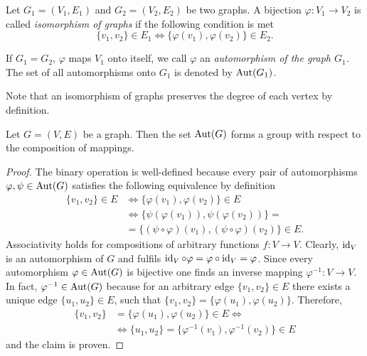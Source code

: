 \begin{defin}
\begin{thmlist}
\item Let $G_1=(V_1,E_1)$ and $G_2=(V_2,E_2)$ be two graphs. A bijection $\varphi\colon V_1 \to V_2$ is called \emph{isomorphism of graphs} if the following condition is met
\begin{equation*}
\lbrace v_1,v_2\rbrace\in E_1 \Leftrightarrow \lbrace \varphi(v_1),\varphi(v_2)\rbrace\in E_2.
\end{equation*}
\item If $G_1=G_2$, \ie $\varphi$ maps $V_1$ onto itself, we call $\varphi$ an \emph{automorphism of the graph $G_1$.} The set of all automorphisms onto $G_1$ is denoted by $\operatorname{Aut}(G_1)$.
\end{thmlist}
\end{defin}
\begin{rem}
Note that an isomorphism of graphs preserves the degree of each vertex by definition.
\end{rem}
\begin{thm}\label{thm:Graph-Automorphisms Form a Group}
Let $G=(V,E)$ be a graph. Then the set $\operatorname{Aut}(G)$ forms a group with respect to the composition of mappings.
\end{thm}
\begin{proof}
The binary operation is well-defined because every pair of automorphisms $\varphi,\psi\in\operatorname{Aut}(G)$ satisfies the following equivalence by definition
\begin{align*}
\lbrace v_1,v_2\rbrace\in E&\Leftrightarrow\lbrace \varphi(v_1),\varphi(v_2)\rbrace\in E\\
&\Leftrightarrow\lbrace \psi(\varphi(v_1)),\psi(\varphi(v_2))\rbrace=\\
&=\lbrace (\psi\circ\varphi)(v_1),(\psi\circ\varphi)(v_2)\rbrace\in E.
\end{align*}
Associativity holds for compositions of arbitrary functions $f\colon V\to V$. Clearly, $\operatorname{id}_V$ is an automorphism of $G$ and fulfils $\operatorname{id}_V\circ\varphi=\varphi\circ\operatorname{id}_V=\varphi$. Since every automorphism $\varphi\in\operatorname{Aut}(G)$ is bijective one finds an inverse mapping $\varphi^{-1}\colon V\to V$. In fact, $\varphi^{-1}\in\operatorname{Aut}(G)$ because for an arbitrary edge $\lbrace v_1,v_2\rbrace\in E$ there exists a unique edge $\lbrace u_1,u_2\rbrace\in E$, such that $\lbrace v_1,v_2\rbrace=\lbrace \varphi(u_1),\varphi(u_2)\rbrace$. Therefore,
\begin{align*}
\lbrace v_1,v_2\rbrace&=\lbrace \varphi(u_1),\varphi(u_2)\rbrace\in E\Leftrightarrow\\
&\Leftrightarrow \lbrace u_1,u_2\rbrace=\lbrace \varphi^{-1}(v_1),\varphi^{-1}(v_2)\rbrace\in E
\end{align*}
and the claim is proven.
\end{proof}